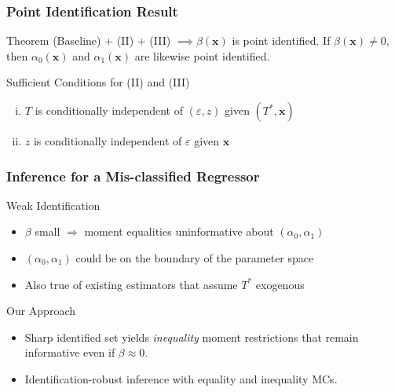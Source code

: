 \documentclass[handout]{beamer}
\begin{document}
\begin{frame}
  \frametitle{Point Identification Result}

  \small 

  \begin{alertblock}{Theorem}
    (Baseline) + (II) + (III) $\implies \beta(\mathbf{x})$ is point identified.
    If $\beta(\mathbf{x}) \neq 0$, then $\alpha_0(\mathbf{x})$ and $\alpha_1(\mathbf{x})$ are likewise point identified.
  \end{alertblock}

\vspace{1em}

  \begin{block}{Sufficient Conditions for (II) and (III)}
    \vspace{-0.5em}
    \begin{enumerate}[(i)]
      \item $T$ is conditionally independent of $(\varepsilon,z)$ given $(T^*,\mathbf{x})$
      \item $z$ is conditionally independent of $\varepsilon$ given $\mathbf{x}$
    \end{enumerate}
  \end{block}
\end{frame}

\begin{frame}[label=INEQ_BODY]
  \frametitle{Inference for a Mis-classified Regressor}
  \small

  \begin{block}{Weak Identification}
\begin{itemize}
  \item $\beta$ small $\Rightarrow$ moment equalities uninformative about $(\alpha_0, \alpha_1)$ \hyperlink{MEQS_APPEND}{}
  \item $(\alpha_0, \alpha_1)$ could be on the boundary of the parameter space
  \item Also true of existing estimators that assume $T^*$ exogenous
\end{itemize}
\end{block}

\begin{alertblock}{Our Approach}

  \begin{itemize}
    \item Sharp identified set yields \emph{inequality} moment restrictions that remain informative even if $\beta \approx 0$.
      \hyperlink{INEQ_APPEND}{}
    \item Identification-robust inference with equality and inequality MCs.
  \end{itemize}
\end{alertblock}



\end{frame}
\end{document}
